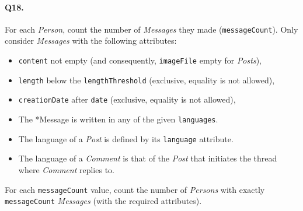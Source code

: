 \paragraph{Q18.}
For each \emph{Person}, count the number of \emph{Messages} they made
(\texttt{messageCount}). Only consider \emph{Messages} with the
following attributes:
\begin{itemize}
\tightlist
\item
  \texttt{content} not empty (and consequently, \texttt{imageFile} empty
  for \emph{Posts}),
\item
  \texttt{length} below the \texttt{lengthThreshold} (exclusive,
  equality is not allowed),
\item
  \texttt{creationDate} after \texttt{date} (exclusive, equality is not
  allowed),
\item
  The *Message is written in any of the given \texttt{languages}.
\item
  The language of a \emph{Post} is defined by its \texttt{language}
  attribute.
\item
  The language of a \emph{Comment} is that of the \emph{Post} that
  initiates the thread where \emph{Comment} replies to.
\end{itemize}
For each \texttt{messageCount} value, count the number of \emph{Persons}
with exactly \texttt{messageCount} \emph{Messages} (with the required
attributes).

